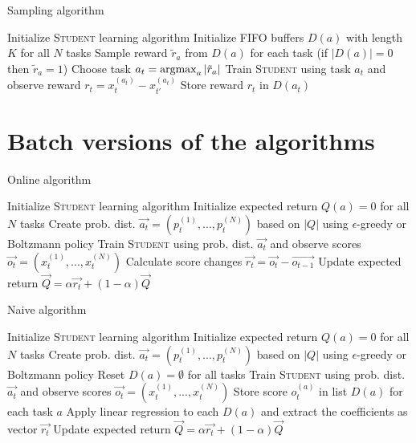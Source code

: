 \begin{appendices}
\begin{algorithm}
\caption{Sampling algorithm}\label{sampling_simple}
\begin{algorithmic}
\State Initialize \textsc{Student} learning algorithm
\State Initialize FIFO buffers $D(a)$ with length $K$ for all $N$ tasks
\State Sample reward $\tilde{r}_a$ from $D(a)$ for each task (if $|D(a)|=0$ then $\tilde{r}_a=1$)
\State Choose task $a_t = \operatorname{argmax}_a |\tilde{r}_a|$
\State Train \textsc{Student} using task $a_t$ and observe reward $r_t = x_t^{(a_t)} - x_{t'}^{(a_t)}$
\State Store reward $r_t$ in $D(a_t)$
\EndFor
\end{algorithmic}
\end{algorithm}

\newpage
\section{Batch versions of the algorithms}
\label{appendix:batch_algs}

\begin{algorithm}
\caption{Online algorithm}\label{online_batch}
\begin{algorithmic}
\State Initialize \textsc{Student} learning algorithm
\State Initialize expected return $Q(a)=0$ for all $N$ tasks
\State Create prob. dist. $\vec{a_t}=(p_t^{(1)}, ..., p_t^{(N)})$ based on $|Q|$ using $\epsilon$-greedy or Boltzmann policy
\State Train \textsc{Student} using prob. dist. $\vec{a_t}$ and observe scores $\vec{o_t} = (x_t^{(1)}, ..., x_t^{(N)})$
\State Calculate score changes $\vec{r_t} = \vec{o_t} - \vec{o_{t-1}}$
\State Update expected return $\vec{Q} = \alpha \vec{r_t} + (1 - \alpha) \vec{Q}$
\EndFor
\end{algorithmic}
\end{algorithm}

\begin{algorithm}
\caption{Naive algorithm}\label{online_naive}
\begin{algorithmic}
\State Initialize \textsc{Student} learning algorithm
\State Initialize expected return $Q(a)=0$ for all $N$ tasks
\State Create prob. dist. $\vec{a_t}=(p_t^{(1)}, ..., p_t^{(N)})$ based on $|Q|$ using $\epsilon$-greedy or Boltzmann policy
\State Reset $D(a)=\emptyset$ for all tasks
\State Train \textsc{Student} using prob. dist. $\vec{a_t}$ and observe scores $\vec{o_t} = (x_t^{(1)}, ..., x_t^{(N)})$
\State Store score $o_t^{(a)}$ in list $D(a)$ for each task $a$
\EndFor
\State Apply linear regression to each $D(a)$ and extract the coefficients as vector $\vec{r_t}$
\State Update expected return $\vec{Q} = \alpha \vec{r_t} + (1 - \alpha) \vec{Q}$
\EndFor
\end{algorithmic}
\end{algorithm}


\end{appendices}
